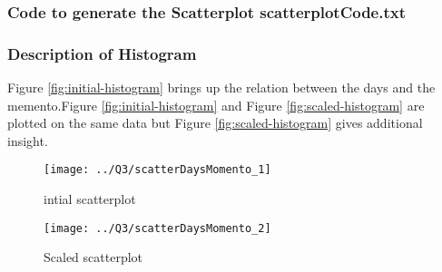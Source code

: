 \documentclass[12pt]{article}
\begin{document}
\subsubsection{Code to generate the Scatterplot scatterplotCode.txt}

\subsubsection{Description of Histogram}
Figure \ref{fig:initial-histogram} brings up the relation between the days and the memento.Figure \ref{fig:initial-histogram} and Figure \ref{fig:scaled-histogram} are plotted on the same data but Figure \ref{fig:scaled-histogram} gives additional insight. 

\begin{figure}[ht]
\texttt{[image: ../Q3/scatterDaysMomento\_1]}
\centering
\caption{intial scatterplot}
\label{intial-scatterplot}
\end{figure}
\newpage

\begin{figure}[ht]
\texttt{[image: ../Q3/scatterDaysMomento\_2]}
\centering
\caption{Scaled scatterplot}
\label{scaled-scatterplot}
\end{figure}
\newpage


\cite{*}
\end{document}
